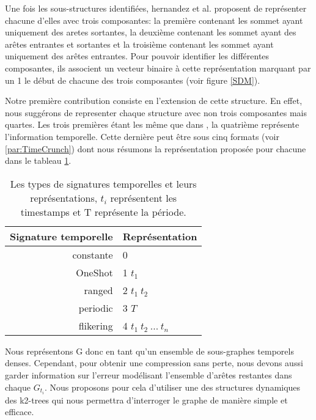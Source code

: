 \documentclass[a4paper,oneside,12pt]{report}
\theoremstyle{definition}
\begin{document}
			Une fois les sous-structures identifiées, hernandez et al. \citep{hernandez2014compressed} proposent de représenter chacune d'elles avec trois composantes: la première contenant les sommet ayant uniquement des aretes sortantes, la deuxième contenant les sommet ayant des arêtes entrantes et sortantes et la troisième contenant les sommet ayant uniquement des arêtes entrantes. Pour pouvoir identifier les différentes composantes, ils associent un vecteur binaire à cette représentation marquant par un 1 le début de chacune des trois composantes (voir figure \ref{SDM}).
			
			Notre première contribution consiste en l'extension de cette structure. En effet, nous suggérons de representer chaque structure avec non trois composantes mais quartes. Les trois premières étant les même que dans \citep{hernandez2014compressed}, la quatrième représente l'information temporelle. Cette dernière peut être sous cinq formats (voir \ref{par:TimeCrunch}) dont nous résumons la représentation proposée pour chacune dans le tableau \ref{tab:signtmp}.
			
			\begin{table}[h]
			\label{tab:signtmp}
			\begin{center}
			\begin{tabular}{|r|l|}
			\hline Signature temporelle & Représentation	
			\\\hline constante & 0	
			
			\\\hline OneShot & 1 $t_{1}$	
			
			\\\hline ranged & 2	$t_{1}\ t_{2}$	
			
			\\\hline periodic & 3  $T$	
			
			\\\hline flikering & 4 $t_{1}\ t_{2}\ ...\ t_{n}$	
			
			\\\hline			
			\end{tabular}
			\end{center}
			
			 \caption{\small {Les types de signatures temporelles et leurs représentations, $t_{i}$	 représentent les timestamps et T représente la période.}}
			\end{table}
			
			Nous représentons G donc en tant qu'un ensemble de sous-graphes temporels denses. Cependant, pour obtenir une compression sans perte, nous devons aussi garder information sur l'erreur modélisant l'ensemble d'arêtes restantes dans chaque $G_{t_{i}}$. Nous proposons pour cela d'utiliser une des structures dynamiques des k2-trees qui nous permettra d'interroger le graphe de manière simple et efficace.
			
\end{document}
